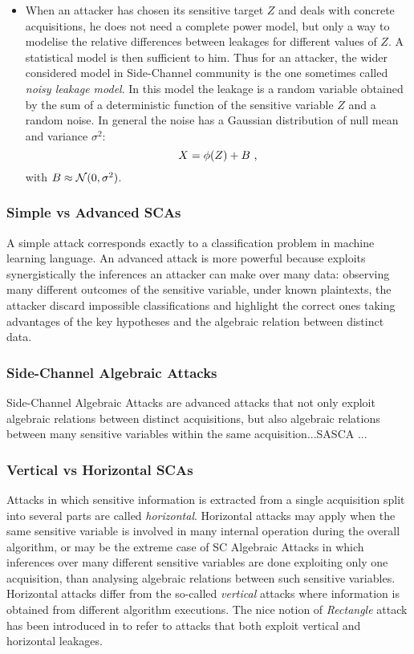 \begin{itemize}
\item When an attacker has chosen its sensitive target $Z$ and deals with concrete acquisitions, he does not need a complete power model, but only  a way to modelise the relative differences between leakages for different values of $Z$. A statistical model is then sufficient to him. Thus for an attacker, the wider considered model in Side-Channel community is the one sometimes called \emph{noisy leakage model}. In this model the leakage is a random variable obtained by the sum of a deterministic function of the sensitive variable $Z$ and a random noise. In general the noise has a Gaussian distribution of null mean and variance $\sigma^2$:
\begin{equation}
X = \phi(Z) + B \mbox{ ,}
\end{equation}
with $B \approx \mathcal{N}(0,\sigma^2)$.

\end{itemize}





\subsubsection{Simple vs Advanced SCAs}
A simple attack corresponds exactly to a classification problem in machine learning language. An advanced attack is more powerful because exploits synergistically the inferences an attacker can make over many data: observing many different outcomes of the sensitive variable, under known plaintexts, the attacker discard impossible classifications and highlight the correct ones taking advantages of the key hypotheses and the algebraic relation between distinct data. 

\subsubsection{Side-Channel Algebraic Attacks}
Side-Channel Algebraic Attacks are advanced attacks that not only exploit algebraic relations between distinct acquisitions, but also algebraic relations between many sensitive variables within the same acquisition...SASCA ...


\subsubsection{Vertical vs Horizontal SCAs}
Attacks in which sensitive information
is extracted from a single acquisition split into several parts are called \emph{horizontal}. Horizontal attacks may apply when the same sensitive variable is involved in many internal operation during the overall algorithm, or may be the extreme case of  SC Algebraic Attacks in which inferences over many different sensitive variables are done exploiting only one acquisition, than analysing algebraic relations between such sensitive variables. Horizontal attacks differ from the so-called \emph{vertical} attacks where information is obtained from different algorithm
executions. The nice notion of \emph{Rectangle} attack has been introduced in \cite{bauer2013horizontal} to refer to attacks that both exploit vertical and horizontal leakages.

